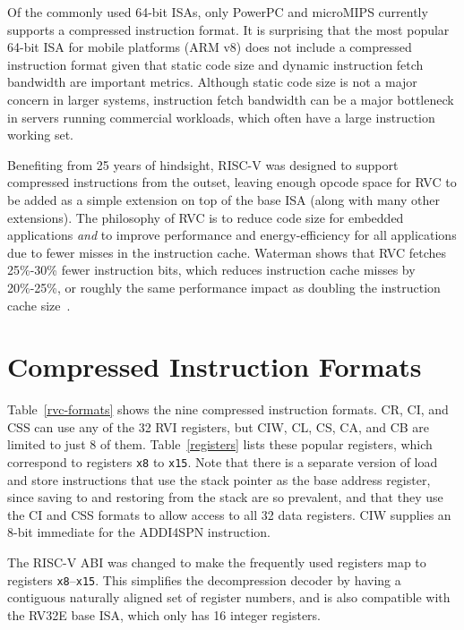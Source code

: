 \begin{commentary}
Of the commonly used 64-bit ISAs, only PowerPC and microMIPS currently
supports a compressed instruction format.  It is surprising that the
most popular 64-bit ISA for mobile platforms (ARM v8) does not include
a compressed instruction format given that static code size and
dynamic instruction fetch bandwidth are important metrics.  Although
static code size is not a major concern in larger systems, instruction
fetch bandwidth can be a major bottleneck in servers running
commercial workloads, which often have a large instruction working
set.

Benefiting from 25 years of hindsight, RISC-V was designed to support
compressed instructions from the outset, leaving enough opcode
space for RVC to be added as a simple extension on top of the base ISA
(along with many other extensions).  The philosophy of RVC is to
reduce code size for embedded applications \emph{and} to improve
performance and energy-efficiency for all applications due to fewer
misses in the instruction cache. Waterman shows that RVC fetches
25\%-30\% fewer instruction bits, which reduces instruction cache
misses by 20\%-25\%, or roughly the same performance impact as
doubling the instruction cache size~\cite{waterman-ms}.
\end{commentary}


\section{Compressed Instruction Formats}

Table~\ref{rvc-formats} shows the nine compressed instruction
formats. CR, CI, and CSS can use any of the 32 RVI registers, but CIW,
CL, CS, CA, and CB are limited to just 8 of them. Table~\ref{registers}
lists these popular registers, which correspond to registers {\tt x8}
to {\tt x15}.  Note that there is a
separate version of load and store instructions that use the stack
pointer as the base address register, since saving to and restoring
from the stack are so prevalent, and that they use the CI and CSS
formats to allow access to all 32 data registers. CIW supplies an
8-bit immediate for the ADDI4SPN instruction.

\begin{commentary}
The RISC-V ABI was changed to make the frequently used registers map
to registers {\tt x8}--{\tt x15}.  This simplifies the decompression
decoder by having a contiguous naturally aligned set of register
numbers, and is also compatible with the RV32E base ISA,
which only has 16 integer registers.
\end{commentary}


